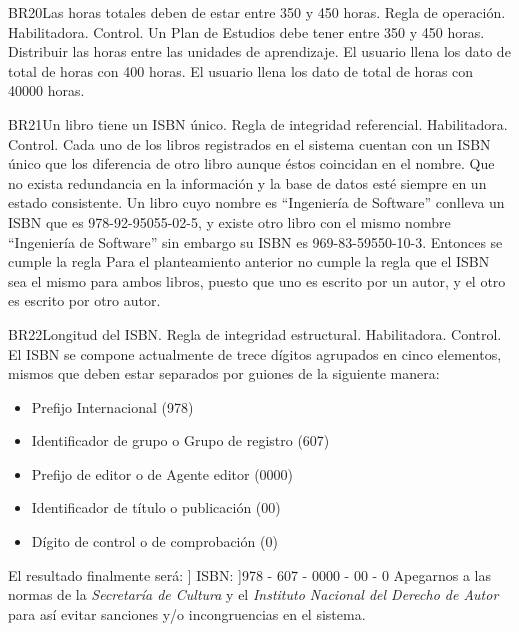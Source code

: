 \begin{BussinesRule}{BR20}{Las horas totales deben de estar entre 350 y 450 horas.}
    \BRitem[Tipo: ]Regla de operación.
    \BRitem[Clase: ]Habilitadora.
    \BRitem[Nivel: ]Control.
    \BRitem[Descripción: ]Un Plan de Estudios debe tener entre 350 y 450 horas.
    \BRitem[Motivación:] Distribuir las horas entre las unidades de aprendizaje.
     El usuario llena los dato de total de horas con 400 horas.
     El usuario llena los dato de total de horas con 40000 horas.
\end{BussinesRule}
\begin{BussinesRule}{BR21}{Un libro tiene un ISBN único.}
    \BRitem[Tipo:] Regla de integridad referencial.
    \BRitem[Clase:] Habilitadora.
    \BRitem[Nivel:] Control.
    \BRitem[Descripción:] Cada uno de los libros registrados en el sistema cuentan con un ISBN único que los diferencia de otro libro aunque éstos coincidan en el nombre.
    \BRitem[Motivación:] Que no exista redundancia en la información y la base de datos esté siempre en un estado consistente.
     Un libro cuyo nombre es ``Ingeniería de Software'' conlleva un ISBN que es 978-92-95055-02-5, y existe otro libro con el mismo nombre ``Ingeniería de Software'' sin embargo su ISBN es 969-83-59550-10-3. Entonces se cumple la regla
     Para el planteamiento anterior no cumple la regla que el ISBN sea el mismo para ambos libros, puesto que uno es escrito por un autor, y el otro es escrito por otro autor.
\end{BussinesRule}
\begin{BussinesRule}{BR22}{Longitud del ISBN.}
    \BRitem[Tipo:] Regla de integridad estructural.
    \BRitem[Clase:] Habilitadora.
    \BRitem[Nivel:] Control.
    \BRitem[Descripción:] El ISBN se compone actualmente de trece dígitos agrupados en cinco elementos, mismos que deben estar separados por guiones de la siguiente manera:
    \begin{itemize}
        \item Prefijo Internacional (978)
        \item Identificador de grupo o Grupo de registro (607)
        \item Prefijo de editor o de Agente editor (0000)
        \item Identificador de título o publicación (00)
        \item Dígito de control o de comprobación (0)
    \end{itemize}
El resultado finalmente será: ] ISBN: ]978 - 607 - 0000 - 00 - 0
    \BRitem[Sentencia:]
    \BRitem[Motivación:] Apegarnos a las normas de la \emph{Secretaría de Cultura} y el \emph{Instituto Nacional del Derecho de Autor} para así evitar sanciones y/o incongruencias en el sistema.
\end{BussinesRule}
